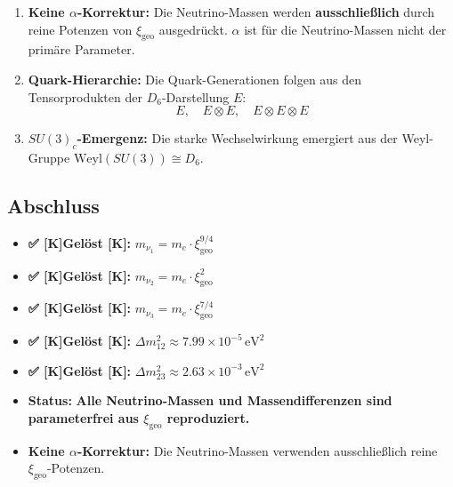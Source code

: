 \documentclass[11pt,a4paper]{article}
\newcommand{\xigeo}{\xi_{\text{geo}}}
\newcommand{\Checkmark}{\textbf{✅ [K]}}
\begin{document}
\begin{enumerate}
		\item \textbf{Keine $\alpha$-Korrektur:} Die Neutrino-Massen werden \textbf{ausschließlich} durch reine Potenzen von $\xigeo$ ausgedrückt. $\alpha$ ist für die Neutrino-Massen nicht der primäre Parameter.
		
		\item \textbf{Quark-Hierarchie:} Die Quark-Generationen folgen aus den Tensorprodukten der $D_6$-Darstellung $E$:
		\begin{equation}
			E, \quad E \otimes E, \quad E \otimes E \otimes E
		\end{equation}
		
		\item \textbf{$SU(3)_c$-Emergenz:} Die starke Wechselwirkung emergiert aus der Weyl-Gruppe $\text{Weyl}(SU(3)) \cong D_6$.
	\end{enumerate}
	
	\subsection{Abschluss}
	
	\begin{tcolorbox}[colback=green!5!white,colframe=green!50!black,title=Status der Neutrino-Berechnungen -- VOLLSTÄNDIG GELÖST]
		\begin{itemize}
			\item \Checkmark \textbf{Gelöst [K]:} $m_{\nu_1} = m_e \cdot \xigeo^{9/4}$
			\item \Checkmark \textbf{Gelöst [K]:} $m_{\nu_2} = m_e \cdot \xigeo^{2}$
			\item \Checkmark \textbf{Gelöst [K]:} $m_{\nu_3} = m_e \cdot \xigeo^{7/4}$
			\item \Checkmark \textbf{Gelöst [K]:} $\Delta m_{12}^2 \approx 7.99 \times 10^{-5}\,\text{eV}^2$
			\item \Checkmark \textbf{Gelöst [K]:} $\Delta m_{23}^2 \approx 2.63 \times 10^{-3}\,\text{eV}^2$
			\item \textbf{Status:} \textbf{Alle Neutrino-Massen und Massendifferenzen sind parameterfrei aus $\xigeo$ reproduziert.}
			\item \textbf{Keine $\alpha$-Korrektur:} Die Neutrino-Massen verwenden ausschließlich reine $\xigeo$-Potenzen.
		\end{itemize}
	\end{tcolorbox}
	
	\vspace{1cm}
	\begin{center}
	\end{center}
	
\end{document}
